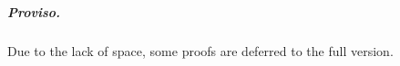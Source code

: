 \documentclass[a4paper,english,cleveref, autoref,numberwithinsect]{lipics-v2019}
\newcommand{\francisco}[1]{{\color{magenta} {\bf Francisco: #1}}}
\begin{document}



\subparagraph*{Proviso.} Due to the lack of space, some proofs are deferred to the full version. 
\end{document}

